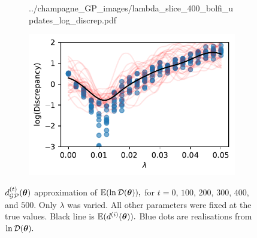 \begin{figure}[htbp]
\begin{subfigure}[b]{0.5\textwidth}
{            ../champagne_GP_images/lambda_slice_400_bolfi_updates_log_discrep.pdf
        }
    \end{subfigure}%
    \hfill%
    \begin{subfigure}[b]{0.5\textwidth}
        \centering
        \includegraphics[width=\textwidth]{
            ../champagne_GP_images/lambda_slice_500_bolfi_updates_log_discrep.pdf
        }
    \end{subfigure}
    \caption{
        $d_{\mathcal{GP}}^{(t)}(\bm{\theta})$ approximation of $\operatorname{\mathbb{E}}(\ln\mathcal{D}(\bm{\theta})),$ 
        for $t= 0$, $100$, $200$, $300$, $400$, and $500.$ Only $\lambda$ was 
        varied. All other parameters were fixed at the true values. Black line 
        is
        $\operatorname{\mathbb{E}}(d^{(i)}(\bm{\theta})).$
        Blue dots are realisations from $\ln\mathcal{D}(\bm{\theta}).$
    }
\end{figure}

